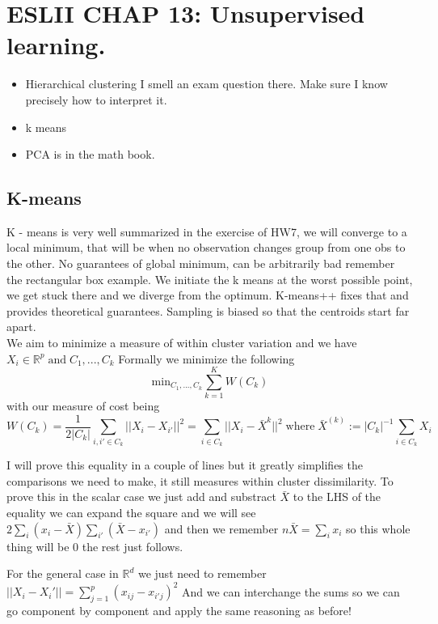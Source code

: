 \documentclass{article}
\begin{document}
\section*{ESLII CHAP 13: Unsupervised learning.}
\begin{itemize}
    \item Hierarchical clustering I smell an exam question there. Make sure I know precisely how to 
    interpret it. 
    \item k means
    \item PCA is in the math book.
    
\end{itemize}

\subsection*{K-means}
K - means is very well summarized in the exercise of HW7, we will converge to a local minimum, that will be when no observation 
changes group from one obs to the other. No guarantees of global minimum, can be arbitrarily bad remember the rectangular box example. 
We initiate the k means at the worst possible point, we get stuck there and we diverge from the optimum. 
K-means++ fixes that and provides theoretical guarantees. Sampling is biased so that the centroids start far apart.
\\
We aim to minimize a measure of within cluster variation and we have $X_i \in \mathbb{R}^p \; \text{and} \; C_1,...,C_k $
Formally we minimize the following $$\text{min}_{C_1,...,C_k} \sum_{k=1}^{K} W(C_k)$$
with our measure of cost being 
$$
W(C_k) = \frac{1}{2|C_k|} \sum_{i,i' \in C_k}||X_i -X_{i'}||^2 =
\sum_{i \in C_k}||X_i -\bar{X}^{k}||^2 \; \text{where} \; \bar{X}^{(k)} := |C_k|^{-1}\sum_{i \in C_k}X_i
$$

I will prove this equality in a couple of lines but it greatly simplifies the comparisons we need to make, it still measures 
within cluster dissimilarity.
To prove this in the scalar case we just add and substract $\bar{X}$ to the LHS of the equality 
we can expand the square and we will see $2\sum_i(x_i - \bar{X})\sum_{i'}(\bar{X}-x_{i'})$ 
and then we remember $n\bar{X} = \sum_i x_i$ so this whole thing will be 0 the rest just follows. 

For the general case in $\mathbb{R}^d$ we just need to remember $||X_i - X_i'|| = \sum_{j=1}^{p}(x_{ij} - x_{i'j})^2$
And we can interchange the sums so we can go component by component and apply the same reasoning as before!
\end{document}
